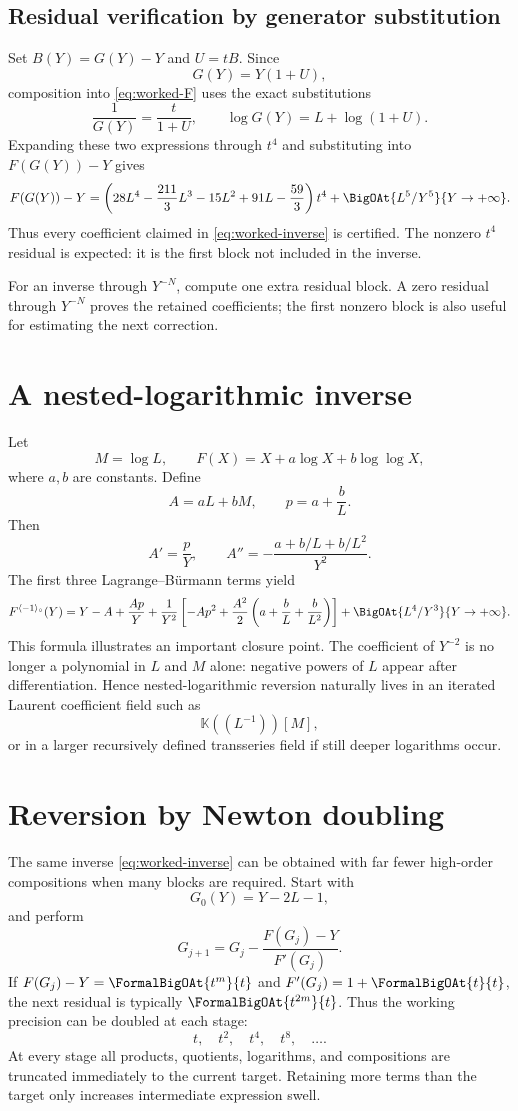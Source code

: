 \documentclass[11pt,oneside]{book}
\theoremstyle{definition}
\theoremstyle{remark}
\newcommand{\K}{\mathbb K}
\newcommand{\compinv}{^{\langle-1\rangle_{\circ}}}
\begin{document}
\subsection{Residual verification by generator substitution}
Set $B(Y)=G(Y)-Y$ and $U=tB$. Since
\[
 G(Y)=Y(1+U),
\]
composition into \eqref{eq:worked-F} uses the exact substitutions
\[
 \frac1{G(Y)}=\frac{t}{1+U},
 \qquad
 \log G(Y)=L+\log(1+U).
\]
Expanding these two expressions through $t^4$ and substituting into
$F(G(Y))-Y$ gives
\[
 F(G(Y))-Y
 =\left(28L^4-\frac{211}{3}L^3-15L^2+91L-\frac{59}{3}\right)t^4
 +\BigOAt{L^5/Y^5}{Y\to+\infty}.
\]
Thus every coefficient claimed in \eqref{eq:worked-inverse} is certified.
The nonzero $t^4$ residual is expected: it is the first block not included in
the inverse.

\begin{computebox}
For an inverse through $Y^{-N}$, compute one extra residual block. A zero
residual through $Y^{-N}$ proves the retained coefficients; the first
nonzero block is also useful for estimating the next correction.
\end{computebox}

\section{A nested-logarithmic inverse}
Let
\[
 M=\log L,\qquad
 F(X)=X+a\log X+b\log\log X,
\]
where $a,b$ are constants. Define
\[
 A=aL+bM,\qquad p=a+\frac bL.
\]
Then
\[
 A'=\frac{p}{Y},\qquad
 A''=-\frac{a+b/L+b/L^2}{Y^2}.
\]
The first three Lagrange--B\"urmann terms yield
\begin{align}
 F\compinv(Y)
 =Y-A+\frac{Ap}{Y}
 +\frac{1}{Y^2}\left[
   -Ap^2+\frac{A^2}{2}
   \left(a+\frac bL+\frac b{L^2}\right)\right]
 +\BigOAt{L^4/Y^3}{Y\to+\infty}.
 \label{eq:nested-log-inverse}
\end{align}
This formula illustrates an important closure point. The coefficient of
$Y^{-2}$ is no longer a polynomial in $L$ and $M$ alone: negative powers of
$L$ appear after differentiation. Hence nested-logarithmic reversion
naturally lives in an iterated Laurent coefficient field such as
\[
 \K((L^{-1}))[M],
\]
or in a larger recursively defined transseries field if still deeper
logarithms occur.

\section{Reversion by Newton doubling}
The same inverse \eqref{eq:worked-inverse} can be obtained with far fewer
high-order compositions when many blocks are required. Start with
\[
 G_0(Y)=Y-2L-1,
\]
and perform
\begin{equation}\label{eq:worked-newton}
 G_{j+1}
 =G_j-\frac{F(G_j)-Y}{F'(G_j)}.
\end{equation}
If $F(G_j)-Y=\FormalBigOAt{t^m}{t}$ and
$F'(G_j)=1+\FormalBigOAt{t}{t}$, the next residual is typically
$\FormalBigOAt{t^{2m}}{t}$. Thus the working precision can be doubled at
each stage:
\[
 t,\quad t^2,\quad t^4,\quad t^8,\quad\ldots.
\]
At every stage all products, quotients, logarithms, and compositions are
truncated immediately to the current target. Retaining more terms than the
target only increases intermediate expression swell.
\end{document}
